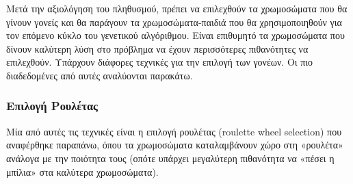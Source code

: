 Μετά την αξιολόγηση του πληθυσμού, πρέπει να επιλεχθούν τα χρωμοσώματα που θα γίνουν γονείς και θα παράγουν τα χρωμοσώματα-παιδιά που θα χρησιμοποιηθούν για τον επόμενο κύκλο του γενετικού αλγόριθμου. Είναι επιθυμητό τα χρωμοσώματα που δίνουν καλύτερη λύση στο πρόβλημα να έχουν περισσότερες πιθανότητες να επιλεχθούν. Υπάρχουν διάφορες τεχνικές για την επιλογή των γονέων. Οι πιο διαδεδομένες από αυτές αναλύονται παρακάτω.

\subsubsection{Επιλογή Ρουλέτας}

Μία από αυτές τις τεχνικές είναι η επιλογή ρουλέτας (roulette wheel selection) που αναφέρθηκε παραπάνω, όπου τα χρωμοσώματα καταλαμβάνουν χώρο στη «ρουλέτα» ανάλογα με την ποιότητα τους (οπότε υπάρχει μεγαλύτερη πιθανότητα να «πέσει η μπίλια» στα καλύτερα χρωμοσώματα).

